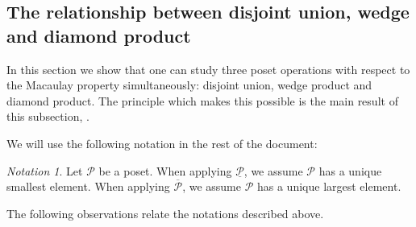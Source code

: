 \documentclass[11pt, reqno]{amsart}
\makeatletter
\renewcommand{\P}{{\mathcal P}}
\newcommand{\uwidehat}[1]{%
	\mathpalette\douwidehat{#1}%
}
\newcommand{\douwidehat}[2]{%
	\sbox0{$\m@th#1\widehat{\hphantom{#2}}$}%
	\sbox2{$\m@th#1x$}
	\sbox4{$\m@th#1#2$}
	\dimen0=\ht0
	\advance\dimen0 -.8\ht2
	\dimen2=\dp4
	\rlap{%
		\raisebox{\dimexpr\dimen0-\dimen2}{%
			\scalebox{1}[-1]{\box0}%
		}%
	}%
	{#2}%
}
\theoremstyle{plain} %
\theoremstyle{definition}
\theoremstyle{remark}
\newtheorem{notation}[thm]{Notation}
\numberwithin{equation}{section}  %
\makeatother
\begin{document}
\subsection{The relationship between disjoint union, wedge and diamond product}
In this section we show that one can study three poset operations with respect to the Macaulay property simultaneously: disjoint union, wedge product and diamond product. The principle which makes this possible is the main result of this subsection, .

We will use the following notation in the rest of the document:

\begin{notation}
    Let $\P$ be a poset. When applying $\underline{\P}$, we assume $\P$ has a unique smallest element. When applying $\overline{\P}$, we assume $\P$ has a unique largest element.  
\end{notation}

The following observations relate the notations described above. 
\end{document}
